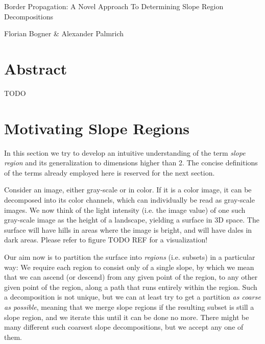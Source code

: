 \documentclass[a4paper,12pt]{paper}
\theoremstyle{plain}
\theoremstyle{definition}
\begin{document}
\begin{titlepage}
\huge
\centering
Border Propagation: A Novel Approach To Determining Slope Region Decompositions

\vfill

\normalsize
Florian Bogner \& Alexander Palmrich
\end{titlepage}




\tableofcontents
\newpage


\section{Abstract}

TODO

\section{Motivating Slope Regions}

In this section we try to develop an intuitive understanding of the term \emph{slope region} and its generalization to dimensions higher than 2. The concise definitions of the terms already employed here is reserved for the next section.

Consider an image, either gray-scale or in color. If it is a color image, it can be decomposed into its color channels, which can individually be read as gray-scale images. We now think of the light intensity (i.e. the image value) of one such gray-scale image as the height of a landscape, yielding a surface in 3D space. The surface will have hills in areas where the image is bright, and will have dales in dark areas. Please refer to figure TODO REF for a visualization!

Our aim now is to partition the surface into \emph{regions} (i.e. subsets) in a particular way: We require each region to consist only of a single slope, by which we mean that we can ascend (or descend) from any given point of the region, to any other given point of the region, along a path that runs entirely within the region. Such a decomposition is not unique, but we can at least try to get a partition \emph{as coarse as possible}, meaning that we merge slope regions if the resulting subset is still a slope region, and we iterate this until it can be done no more. There might be many different such coarsest slope decompositions, but we accept any one of them.
\end{document}
